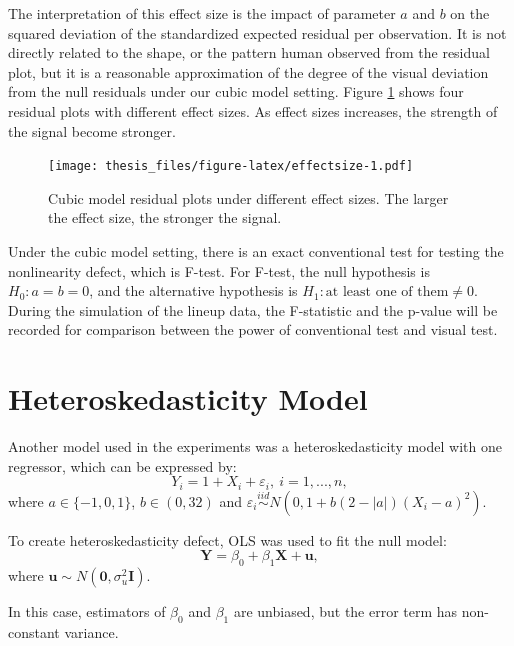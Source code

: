\documentclass{monashthesis}
\theoremstyle{definition}
\theoremstyle{definition}
\theoremstyle{definition}
\theoremstyle{definition}
\theoremstyle{remark}
\begin{document}
The interpretation of this effect size is the impact of parameter \(a\) and \(b\) on the squared deviation of the standardized expected residual per observation. It is not directly related to the shape, or the pattern human observed from the residual plot, but it is a reasonable approximation of the degree of the visual deviation from the null residuals under our cubic model setting. Figure \ref{fig:effectsize} shows four residual plots with different effect sizes. As effect sizes increases, the strength of the signal become stronger.

\begin{figure}
\centering
\texttt{[image: thesis\_files/figure-latex/effectsize-1.pdf]}
\caption{\label{fig:effectsize}Cubic model residual plots under different effect sizes. The larger the effect size, the stronger the signal.}
\end{figure}

Under the cubic model setting, there is an exact conventional test for testing the nonlinearity defect, which is F-test. For F-test, the null hypothesis is \(H_0:a=b=0\), and the alternative hypothesis is \(H_1:\text{at least one of them} \neq 0\). During the simulation of the lineup data, the F-statistic and the p-value will be recorded for comparison between the power of conventional test and visual test.

\hypertarget{heteroskedasticity-model}{%
\section{Heteroskedasticity Model}\label{heteroskedasticity-model}}

Another model used in the experiments was a heteroskedasticity model with one regressor, which can be expressed by:
\begin{equation} \label{eq:heter}
Y_i = 1 + X_i + \varepsilon_i, ~i = 1,...,n,
\end{equation}
where \(a \in \{-1,0,1\}\), \(b\in (0,32)\) and \(\varepsilon_i \overset{iid}{\sim} N(0,1+b(2-|a|)(X_i-a)^2)\).

To create heteroskedasticity defect, OLS was used to fit the null model:
\begin{equation} \label{eq:heter_null}
\boldsymbol{Y}=\beta_0+\beta_1\boldsymbol{X}+\boldsymbol{u},
\end{equation}
where \(\boldsymbol{u} \sim N(\boldsymbol{0}, \sigma^2_u\boldsymbol{I})\).

In this case, estimators of \(\beta_0\) and \(\beta_1\) are unbiased, but the error term has non-constant variance.
\end{document}
